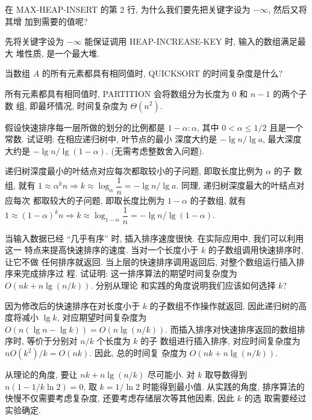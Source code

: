 \documentclass[boxes]{homework}
\begin{document}
\begin{problem}
在 MAX-HEAP-INSERT 的第 2 行, 为什么我们要先把关键字设为 $-\infty$, 然后又将其增
加到需要的值呢?
\end{problem}
\begin{solution}
    先将关键字设为 $-\infty$ 能保证调用 HEAP-INCREASE-KEY 时, 输入的数组满足最大
    堆性质, 是一个最大堆.
\end{solution}

\begin{problem}
当数组 $A$ 的所有元素都具有相同值时, QUICKSORT 的时间复杂度是什么?
\end{problem}
\begin{solution}
    所有元素都具有相同值时, PARTITION 会将数组分为长度为 0 和 $n - 1$ 的两个子数
    组, 即最坏情况, 时间复杂度为 $\Theta \left( n^{2}\right)$.
\end{solution}

\begin{problem}
假设快速排序每一层所做的划分的比例都是 $1 - \alpha : \alpha$, 其中
$0 < \alpha \leqslant 1 / 2$ 且是一个常数. 试证明: 在相应递归树中, 叶节点的最小
深度大约是 $- \lg n / \lg a$, 最大深度大约是 $- \lg n / \lg (1 - \alpha)$.
(无需考虑整数舍入问题).
\end{problem}
\begin{solution}
    递归树深度最小的叶结点对应每次都取较小的子问题, 即取长度比例为 $\alpha$ 的子
    数组, 就有 $1 \approx \alpha^{k}n \Rightarrow k \approx  \log_{\alpha}
        \dfrac{ 1 }{ n } = -\lg n / \lg a$. 同理, 递归树深度最大的叶结点对应每次
    都取较大的子问题, 即取长度比例为 $1 - \alpha$ 的子数组, 就有 $1 \approx
        (1 - \alpha)^{k}n \Rightarrow k \approx  \log_{1 - \alpha}
        \dfrac{ 1 }{ n } = -\lg n / \lg (1 - \alpha)$.
\end{solution}

\begin{problem}
当输入数据已经 ``几乎有序'' 时, 插入排序速度很快. 在实际应用中, 我们可以利用这一
特点来提高快速排序的速度. 当对一个长度小于 $k$ 的子数组调用快速排序时, 让它不做
任何排序就返回. 当上层的快速排序调用返回后, 对整个数组运行插入排序来完成排序过
程. 试证明: 这一排序算法的期望时间复杂度为 $O (nk + n\lg (n / k))$. 分别从理论
和实践的角度说明我们应该如何选择 $k$?
\end{problem}
\begin{solution}
    因为修改后的快速排序在对长度小于 $k$ 的子数组不作操作就返回, 因此递归树的高
    度将减小 $\lg k$, 对应期望时间复杂度为 $O(n (\lg n-\lg k)) = O(n\lg (n/k))$.
    而插入排序对快速排序返回的数组排序时, 等价于分别对 $n / k$ 个长度为 $k$ 的子
    数组进行插入排序, 对应时间复杂度为 $n O(k^{2})/k = O(nk)$. 因此, 总的时间复
    杂度为 $O(nk + n\lg (n / k))$.

    从理论的角度, 要让 $nk + n\lg (n / k)$ 尽可能小. 对 $k$ 取导数得到
    $n (1 - 1 / k\ln 2) = 0$, 取 $k = 1 / \ln 2$ 时能得到最小值. 从实践的角度,
    排序算法的快慢不仅需要考虑复杂度, 还要考虑存储层次等其他因素, 因此 $k$ 的选
    取需要经过实验确定.
\end{solution}
\end{document}
